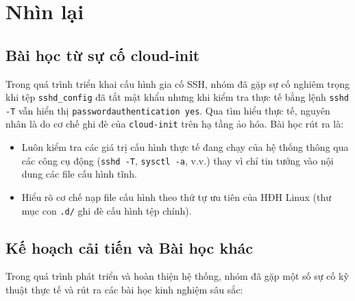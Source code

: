\documentclass[a4paper,12pt]{article}
\begin{document}
\newpage
\section{Nhìn lại}
\subsection{Bài học từ sự cố cloud-init}
Trong quá trình triển khai cấu hình gia cố SSH, nhóm đã gặp sự cố nghiêm trọng khi tệp \texttt{sshd\_config} đã tắt mật khẩu nhưng khi kiểm tra thực tế bằng lệnh \texttt{sshd -T} vẫn hiển thị \texttt{passwordauthentication yes}.
\newline Qua tìm hiểu thực tế, nguyên nhân là do cơ chế ghi đè của \texttt{cloud-init} trên hạ tầng ảo hóa. Bài học rút ra là:
\begin{itemize}
    \item Luôn kiểm tra các giá trị cấu hình thực tế đang chạy của hệ thống thông qua các công cụ động (\texttt{sshd -T}, \texttt{sysctl -a}, v.v.) thay vì chỉ tin tưởng vào nội dung các file cấu hình tĩnh.
    \item Hiểu rõ cơ chế nạp file cấu hình theo thứ tự ưu tiên của HĐH Linux (thư mục con \texttt{.d/} ghi đè cấu hình tệp chính).
\end{itemize}

\subsection{Kế hoạch cải tiến và Bài học khác}
Trong quá trình phát triển và hoàn thiện hệ thống, nhóm đã gặp một số sự cố kỹ thuật thực tế và rút ra các bài học kinh nghiệm sâu sắc:
\end{document}

